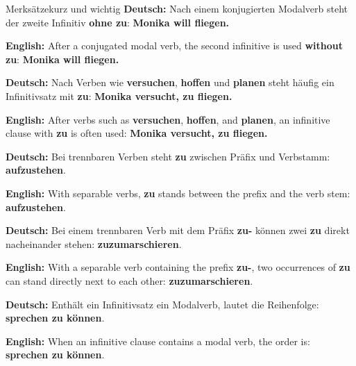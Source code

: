 \documentclass[a4paper,11pt]{article}
\newcommand{\GermanText}[1]{\textbf{Deutsch: }#1\par}
\newcommand{\EnglishText}[1]{{\small\color{SoftGray}\textbf{English: }#1\par}}
\begin{document}
        \begin{grammarentry}{Merksätze}{kurz und wichtig}
            \GermanText{Nach einem konjugierten Modalverb steht der zweite Infinitiv \textbf{ohne zu}: \textbf{Monika will fliegen.}}
            \EnglishText{After a conjugated modal verb, the second infinitive is used \textbf{without zu}: \textbf{Monika will fliegen.}}

            \GermanText{Nach Verben wie \textbf{versuchen}, \textbf{hoffen} und \textbf{planen} steht häufig ein Infinitivsatz mit \textbf{zu}: \textbf{Monika versucht, zu fliegen.}}
            \EnglishText{After verbs such as \textbf{versuchen}, \textbf{hoffen}, and \textbf{planen}, an infinitive clause with \textbf{zu} is often used: \textbf{Monika versucht, zu fliegen.}}

            \GermanText{Bei trennbaren Verben steht \textbf{zu} zwischen Präfix und Verbstamm: \textbf{aufzustehen}.}
            \EnglishText{With separable verbs, \textbf{zu} stands between the prefix and the verb stem: \textbf{aufzustehen}.}

            \GermanText{Bei einem trennbaren Verb mit dem Präfix \textbf{zu-} können zwei \textbf{zu} direkt nacheinander stehen: \textbf{zuzumarschieren}.}
            \EnglishText{With a separable verb containing the prefix \textbf{zu-}, two occurrences of \textbf{zu} can stand directly next to each other: \textbf{zuzumarschieren}.}

            \GermanText{Enthält ein Infinitivsatz ein Modalverb, lautet die Reihenfolge: \textbf{sprechen zu können}.}
            \EnglishText{When an infinitive clause contains a modal verb, the order is: \textbf{sprechen zu können}.}
        \end{grammarentry}
\end{document}
